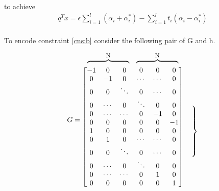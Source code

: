 \documentclass[12pt,notitlepage,twoside]{scrreprt}
\begin{document}
to achieve 
\begin{gather*}
  q^T x =
\epsilon \sum_{i=1}^{l}(\alpha_i+\alpha_i^*)-\sum_{i=1}^{l}t_i(\alpha_i-\alpha_i^*)
\end{gather*}
\paragraph*{}
To encode constraint \ref{cns:b} consider the following pair of G and h.

\[G =
\begin{matrix} %
    \begin{matrix}   %
      \overbrace{\hphantom{\begin{matrix}-1 & \cdots & -1\end{matrix}}}^{\text{\footnotesize N}}
                                  &
      \overbrace{
        \hphantom{\begin{matrix}-1 & \cdots & -1\end{matrix}}
      }^{\text{\footnotesize N}}
    \end{matrix}
    &
  \\
\begin{bmatrix}
 -1 & 0 & 0 & 0 & 0 & 0\\
  0 & -1 & 0 & \cdots & \cdots & 0\\
  0 & 0 & \ddots  & 0 & \cdots & 0\\
  0 & \cdots & 0 & \ddots & 0 & 0\\
  0 & \cdots & \cdots & 0 & -1 & 0\\
  0 & 0 & 0 & 0 & 0 & -1 \\
  1 & 0 & 0 & 0 & 0 & 0\\
  0 & 1 & 0 & \cdots & \cdots & 0\\
  0 & 0 & \ddots  & 0 & \cdots & 0\\
  0 & \cdots & 0 & \ddots & 0 & 0\\
  0 & \cdots & \cdots & 0 & 1 & 0\\
  0 & 0 & 0 & 0 & 0 & 1 \\
\end{bmatrix}
  &
    \begin{matrix}    %
      \vphantom{0} \\ %
        \left.\vphantom{\begin{matrix} 0 \\ 0 \\ 0 \\ 0 \\ 0 \\ 0 \\\end{matrix}}\right\}

\end{matrix}
\end{matrix}\]
\end{document}
